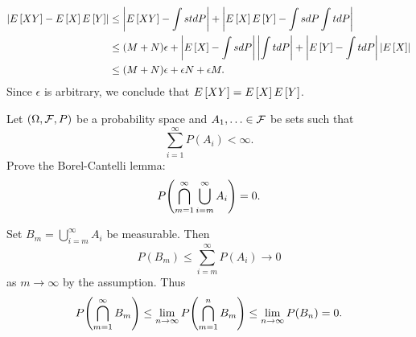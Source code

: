 \begin{solution}
\begin{equation*}
        \begin{split}
            \left\lvert {E\left[ {XY} \right] - E\left[ {X} \right]E\left[ {Y} \right]} \right\rvert 
            &\leq \left\lvert {E\left[ {XY} \right] - \int stdP} \right\rvert + \left\lvert {E\left[ {X} \right]E\left[ {Y} \right] - \int s dP \int t dP} \right\rvert \\ 
            &\leq (M+N)\epsilon + \left\lvert {E\left[ {X} \right] - \int sdP} \right\rvert\left\lvert {\int t dP} \right\rvert + \left\lvert {E\left[ {Y} \right] - \int tdP} \right\rvert\left\lvert {E\left[ {X} \right]} \right\rvert \\ 
            &\leq (M+N)\epsilon + \epsilon N + \epsilon M.
        \end{split}
    \end{equation*}
    Since $\epsilon$ is arbitrary, we conclude that $E\left[ {XY} \right] = E\left[ {X} \right]E\left[ {Y} \right]$.
\end{solution}

\begin{exercise}{2.6}
    Let $(\Omega,\mathcal{F},P)$ be a probability space and $A_1,\ldots\in\mathcal{F}$ be sets such that 
    \begin{equation*}
        \sum_{i=1}^\infty P(A_i) < \infty.
    \end{equation*}
    Prove the Borel-Cantelli lemma:
    \begin{equation*}
        P\pth{\bigcap_{m=1}^\infty\bigcup_{i=m}^\infty A_i} = 0.
    \end{equation*}
\end{exercise}
\begin{solution}
    Set $B_m = \bigcup_{i=m}^\infty A_i$ be measurable. Then 
    \begin{equation*}
        P(B_m) \leq \sum_{i=m}^\infty P(A_i) \to 0
    \end{equation*}
    as $m\to\infty$ by the assumption. Thus 
    \begin{equation*}
        P\pth{\bigcap_{m=1}^\infty B_m} \leq \lim_{n\to\infty} P\pth{\bigcap_{m=1}^n B_m}
        \leq \lim_{n\to\infty} P(B_n) = 0.
    \end{equation*}
\end{solution}


